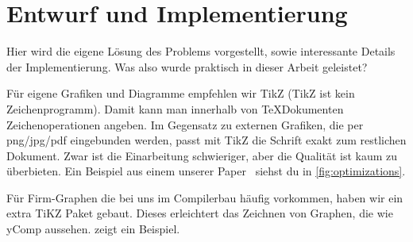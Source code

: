 \chapter{Entwurf und Implementierung}\label{sec:impl}

Hier wird die eigene Lösung des Problems vorgestellt,
sowie interessante Details der Implementierung.
Was also wurde praktisch in dieser Arbeit geleistet?



Für eigene Grafiken und Diagramme empfehlen wir TikZ
(TikZ ist kein Zeichenprogramm).
Damit kann man innerhalb von \TeX Dokumenten Zeichenoperationen angeben.
Im Gegensatz zu externen Grafiken,
die per png/jpg/pdf eingebunden werden,
passt mit TikZ die Schrift exakt zum restlichen Dokument.
Zwar ist die Einarbeitung schwieriger,
aber die Qualität ist kaum zu überbieten.
Ein Beispiel aus einem unserer Paper~\cite{braun13cc}
siehst du in \cref{fig:optimizations}.



Für Firm-Graphen die bei uns im Compilerbau häufig vorkommen,
haben wir ein extra TiKZ Paket gebaut.
Dieses erleichtert das Zeichnen von Graphen,
die wie yComp aussehen.
 zeigt ein Beispiel.

